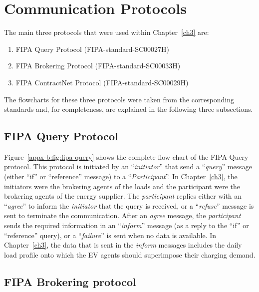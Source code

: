 \section{Communication Protocols}

The main three protocols that were used within Chapter~\ref{ch3} are:

\begin{enumerate}
	\item FIPA Query Protocol (FIPA-standard-SC00027H)
	\item FIPA Brokering Protocol (FIPA-standard-SC00033H)
	\item FIPA ContractNet Protocol (FIPA-standard-SC00029H)
\end{enumerate}

The flowcharts for these three protocols were taken from the corresponding standards and, for completeness, are explained in the following three subsections.

\subsection{FIPA Query Protocol}
\label{appx-b:subsec:fipa-query-protocol}



Figure~\ref{appx-b:fig:fipa-query} shows the complete flow chart of the FIPA Query protocol.
This protocol is initiated by an ``\textit{initiator}'' that send a ``\textit{query}'' message (either ``if'' or ``reference'' message) to a ``\textit{Participant}''.
In Chapter~\ref{ch3}, the initiators were the brokering agents of the loads and the participant were the brokering agents of the energy supplier.
The \textit{participant} replies either with an ``\textit{agree}'' to inform the \textit{initiator} that the query is received, or a ``\textit{refuse}'' message is sent to terminate the communication.
After an \textit{agree} message, the \textit{participant} sends the required information in an ``\textit{inform}'' message (as a reply to the ``if'' or ``reference'' query), or a ``\textit{failure}'' is sent when no data is available.
In Chapter~\ref{ch3}, the data that is sent in the \textit{inform} messages includes the daily load profile onto which the EV agents should superimpose their charging demand.

\subsection{FIPA Brokering protocol}
\label{appx-b:subsec:fipa-brokering-protocol}

